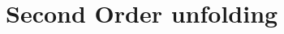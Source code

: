 \documentclass[a4paper,dottedtoc,headinclude,footinclude]{report} %
\theoremstyle{plain}
\begin{document}
    \section{Second Order unfolding}
    \lipsum[1]

\end{document}
